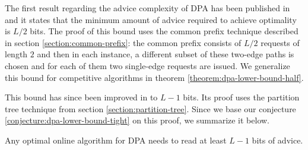 The first result regarding the advice complexity of DPA has been published
in \cite{komm-thesis} and it states that the minimum amount of advice
required to achieve optimality is $L/2$ bits. The proof of this bound
uses the common prefix technique described in section
\ref{section:common-prefix}: the common prefix consists of $L/2$
requests of length $2$ and then in each instance, a different subset of
these two-edge paths is chosen and for each of them two single-edge
requests are issued. We generalize this bound for competitive algorithms
in theorem \ref{theorem:dpa-lower-bound-half}.


This bound has since been improved in \cite{sofsem2014} to $L-1$ bits. Its
proof uses the partition tree technique from section
\ref{section:partition-tree}. Since we base our conjecture
\ref{conjecture:dpa-lower-bound-tight} on this proof, we summarize it
below.

\begin{theorem}\label{theorem:dpa-lower-optimal}
    Any optimal online algorithm for DPA needs to read at least $L-1$ bits
    of advice.
\end{theorem}


